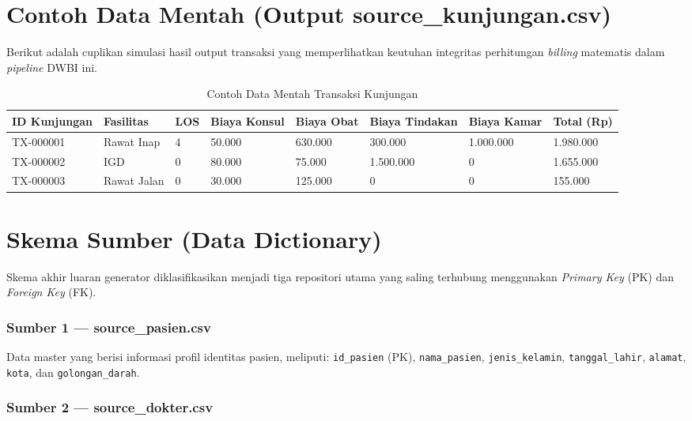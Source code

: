 \section{Contoh Data Mentah (Output source\_kunjungan.csv)}
 
Berikut adalah cuplikan simulasi hasil output transaksi yang memperlihatkan keutuhan integritas perhitungan \textit{billing} matematis dalam \textit{pipeline} DWBI ini.
 
\begin{table}[H]
\centering
\caption{Contoh Data Mentah Transaksi Kunjungan}
\small
\begin{tabularx}{\linewidth}{p{2cm}p{2cm}p{0.8cm}p{1.8cm}p{1.8cm}p{2cm}p{1.8cm}X}
\toprule
\textbf{ID Kunjungan} & \textbf{Fasilitas} & \textbf{LOS} & \textbf{Biaya Konsul} & \textbf{Biaya Obat} & \textbf{Biaya Tindakan} & \textbf{Biaya Kamar} & \textbf{Total (Rp)} \\
\midrule
TX-000001 & Rawat Inap   & 4 & 50.000  & 630.000 & 300.000   & 1.000.000 & 1.980.000 \\
TX-000002 & IGD          & 0 & 80.000  & 75.000  & 1.500.000 & 0         & 1.655.000 \\
TX-000003 & Rawat Jalan  & 0 & 30.000  & 125.000 & 0         & 0         & 155.000   \\
\bottomrule
\end{tabularx}
\end{table}
 
\section{Skema Sumber (Data Dictionary)}
 
Skema akhir luaran generator diklasifikasikan menjadi tiga repositori utama yang saling terhubung menggunakan \textit{Primary Key} (PK) dan \textit{Foreign Key} (FK).
 
\subsubsection{Sumber 1 — source\_pasien.csv}
 
Data master yang berisi informasi profil identitas pasien, meliputi: \texttt{id\_pasien} (PK), \texttt{nama\_pasien}, \texttt{jenis\_kelamin}, \texttt{tanggal\_lahir}, \texttt{alamat}, \texttt{kota}, dan \texttt{golongan\_darah}.
 
\subsubsection{Sumber 2 — source\_dokter.csv}
 
